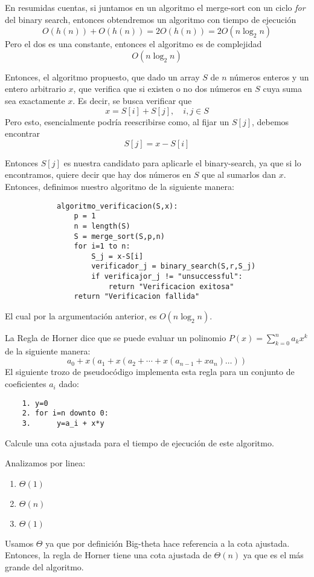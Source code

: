 \begin{problema}
\begin{sol}
        En resumidas cuentas, si juntamos en un algoritmo el merge-sort con un ciclo \textit{for} del binary search, entonces obtendremos un algoritmo con tiempo de ejecución
        $$O(h(n))+O(h(n))=2O(h(n))=2O(n\log_2n)$$
        Pero el dos es una constante, entonces el algoritmo es de complejidad 
        $$O(n\log_2n)$$

        Entonces, el algoritmo propuesto, que dado un array $S$ de $n$ números enteros y un entero arbitrario $x$, que verifica que si existen o no dos números en $S$ cuya suma sea exactamente $x$. Es decir, se busca verificar que 
        $$x= S[i]+S[j],\quad i,j\in S$$
        Pero esto, esencialmente podría reescribirse como, al fijar un $S[j]$, debemos encontrar 
        $$S[j]=x-S[i]$$
        
        Entonces $S[j]$ es nuestra candidato para aplicarle el binary-search, ya que si lo encontramos, quiere decir que hay dos números en $S$ que al sumarlos dan $x$. 
        Entonces, definimos nuestro algoritmo de la siguiente manera: 
        
        \begin{verbatim}
            algoritmo_verificacion(S,x):
                p = 1
                n = length(S)
                S = merge_sort(S,p,n)
                for i=1 to n: 
                    S_j = x-S[i]
                    verificador_j = binary_search(S,r,S_j)
                    if verificajor_j != "unsuccessful": 
                        return "Verificacion exitosa"
                return "Verificacion fallida"
        \end{verbatim}

        El cual por la argumentación anterior, es $O(n\log_2 n)$.
     \end{sol}
\end{problema}

\begin{problema}La Regla de Horner dice que se puede evaluar un polinomio $P(x)=\sum_{k=0}^n a_k x^k$ de la siguiente manera:
$$
a_0+x\left(a_1+x\left(a_2+\cdots+x\left(a_{n-1}+x a_n\right) \ldots\right)\right)
$$
El siguiente trozo de pseudocódigo implementa esta regla para un conjunto de coeficientes $a_i$ dado:
\begin{verbatim}
    1. y=0
    2. for i=n downto 0:
    3.      y=a_i + x*y
\end{verbatim}
Calcule una cota ajustada para el tiempo de ejecución de este algoritmo.
\begin{sol}
    Analizamos por linea: 
    \begin{enumerate}
        \item $\Theta(1)$
        \item $\Theta(n)$
        \item $\Theta(1)$
    \end{enumerate}
    Usamos $\Theta$ ya que por definición Big-theta hace referencia a la cota ajustada. Entonces, la regla de Horner tiene una cota ajustada de $\Theta(n)$ ya que es el más grande del algoritmo. 
\end{sol}


\end{problema}

